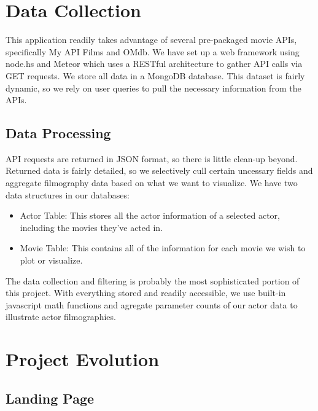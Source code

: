 \documentclass[12pt]{article}
\begin{document}
\newpage 

\section{Data Collection}
	This application readily takes advantage of several pre-packaged movie APIs, specifically My API Films and OMdb. We have set up a web framework using node.hs and Meteor which uses a RESTful architecture to gather API calls via GET requests. We store all data in a MongoDB database. This dataset is fairly dynamic, so we rely on user queries to pull the necessary information from the APIs.
	
\subsection{Data Processing}
	API requests are returned in JSON format, so there is little clean-up beyond. Returned data is fairly detailed, so we selectively cull certain uncessary fields and aggregate filmography data based on what we want to visualize. We have two data structures in our databases:
	
	\begin{itemize}
		\item Actor Table: This stores all the actor information of a selected actor, including the movies they've acted in.
		\item Movie Table: This contains all of the information for each movie we wish to plot or visualize.
	\end{itemize}
	
	The data collection and filtering is probably the most sophisticated portion of this project. With everything stored and readily accessible, we use built-in javascript math functions and agregate parameter counts of our actor data to illustrate actor filmographies.

\newpage 

\section{Project Evolution}

\subsection{Landing Page}

	
\end{document}
